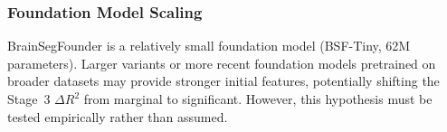 \subsubsection{Foundation Model Scaling}

BrainSegFounder is a relatively small foundation model (BSF-Tiny, 62M
parameters). Larger variants or more recent foundation models pretrained on
broader datasets may provide stronger initial features, potentially shifting
the Stage~3 $\Delta R^2$ from marginal to significant. However, this
hypothesis must be tested empirically rather than assumed.
